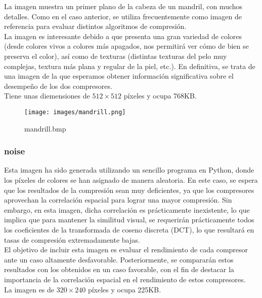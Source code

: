 \documentclass[12pt,a4paper]{article}
\begin{document}
La imagen muestra un primer plano de la cabeza de un mandril, con muchos detalles. Como en el caso anterior, se utiliza frecuentemente como imagen de referencia para evaluar distintos algoritmos de compresión.\\

La imagen es interesante debido a que presenta una gran variedad de colores (desde colores vivos a colores más apagados, nos permitirá ver cómo de bien se preserva el color), así como de texturas (distintas texturas del pelo muy complejas, textura más plana y regular de la piel, etc.). En definitiva, se trata de una imagen de la que esperamos obtener información significativa sobre el desempeño de los dos compresores.\\ 

Tiene unas diemensiones de $512\times512$ píxeles y ocupa 768KB.\\

\begin{figure}[H]
    \centering
    \texttt{[image: images/mandrill.png]}
    \caption{mandrill.bmp}
\end{figure}

\break
\subsubsection{noise} \label{noisepre}
Esta imagen ha sido generada utilizando un sencillo programa en Python, donde los píxeles de colores se han asignado de manera aleatoria. En este caso, se espera que los resultados de la compresión sean muy deficientes, ya que los compresores aprovechan la correlación espacial para lograr una mayor compresión. Sin embargo, en esta imagen, dicha correlación es prácticamente inexistente, lo que implica que para mantener la similitud visual, se requerirán prácticamente todos los coeficientes de la transformada de coseno discreta (DCT), lo que resultará en tasas de compresión extremadamente bajas.\\

El objetivo de incluir esta imagen es evaluar el rendimiento de cada compresor ante un caso altamente desfavorable. Posteriormente, se compararán estos resultados con los obtenidos en un caso favorable, con el fin de destacar la importancia de la correlación espacial en el rendimiento de estos compresores.\\

La imagen es de $320\times240$ píxeles y ocupa 225KB.\\
\end{document}
